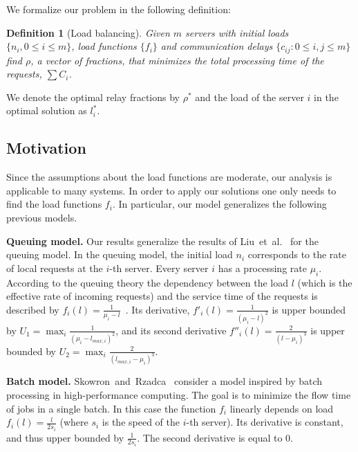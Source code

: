 \documentclass[11pt]{article}
\newcommand{\lmaxi}{{{l_{\mathit{max}, i}}}}
\newtheorem{definition}{Definition}
\begin{document}
We formalize our problem in the following definition:
\begin{definition}[Load balancing]
Given $m$ servers with initial loads $\{n_{i}, 0 \leq i \leq m\}$, load functions $\{f_i\}$ and  communication delays $\{c_{ij}: 0 \leq i,j \leq m\}$ find $\rho$, a vector of fractions, that minimizes the total processing time of the requests, $\sum{C_{i}}$.
\end{definition}

We denote the optimal relay fractions by $\rho^{*}$ and the load of the server $i$ in the optimal solution as $l^{*}_i$.
















\subsection{Motivation}\label{sec:specialCases}

Since the assumptions about the load functions are moderate, our analysis is applicable to many systems. In order to apply our solutions one only needs to find the load functions $f_i$. In particular, our model generalizes the following previous models.

\medskip
\noindent
\textbf{Queuing model.}\quad
Our results generalize the results of Liu~et~al.~\cite{Liu:2011:GGL:1993744.1993767} for the queuing model.
In the queuing model, the initial load $n_i$ corresponds to the rate of local requests at the $i$-th server. Every server $i$ has a processing rate $\mu_i$. According to the queuing theory the dependency between the load $l$ (which is the effective rate of incoming requests) and the service time of the requests is described by $f_i(l) = \frac{1}{\mu_i - l}$~\cite{Gross:2008:FQT:1972549}.
Its derivative, $f'_i(l) = \frac{1}{(\mu_i - l)^2}$ is upper bounded by $U_1 = \max_i \frac{1}{(\mu_i - \lmaxi)^2}$, and its second derivative $f''_i(l) = \frac{2}{(l - \mu_i)^3}$ is upper bounded by $U_2 = \max_i \frac{2}{(\lmaxi - \mu_i)^3}$.

\medskip
\noindent
\textbf{Batch model.}\quad
Skowron~and~Rzadca~\cite{Skowron:2013:NDL:2510648.2510769} consider a model inspired by batch processing in high-performance computing. 
The goal is to minimize the flow time of jobs in a single batch.
In this case the function $f_i$ linearly depends on load $f_i(l) = \frac{l}{2s_i}$ (where $s_i$ is the speed of the $i$-th server). 
Its derivative is constant, and thus upper bounded by $\frac{1}{2s_i}$. The second derivative is equal to 0.
\end{document}
